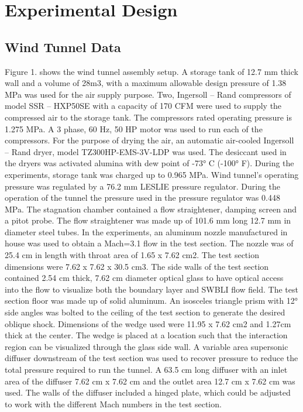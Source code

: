 \documentclass{article}
\begin{document}
\section{Experimental Design}
\subsection{Wind Tunnel Data}
Figure 1. shows the wind tunnel assembly setup. A storage tank of 12.7 mm thick wall and a volume of 28m3, with a maximum allowable design pressure of 1.38 MPa was used for the air supply purpose. Two, Ingersoll – Rand compressors of model SSR – HXP50SE with a capacity of 170 CFM were used to supply the compressed air to the storage tank. The compressors rated operating pressure is 1.275 MPa. A 3 phase, 60 Hz, 50 HP motor was used to run each of the compressors. For the purpose of drying the air, an automatic air-cooled Ingersoll – Rand dryer, model TZ300HP-EMS-3V-LDP was used.  The desiccant used in the dryers was activated alumina with dew point of -73° C (-100° F). During the experiments, storage tank was charged up to 0.965 MPa.
	Wind tunnel’s operating pressure was regulated by a 76.2 mm LESLIE pressure regulator. During the operation of the tunnel the pressure used in the pressure regulator was 0.448 MPa. The stagnation chamber contained a flow straightener, damping screen and a pitot probe. The flow straightener was made up of 101.6 mm long 12.7 mm in diameter steel tubes. In the experiments, an aluminum nozzle manufactured in house was used to obtain a Mach=3.1 flow in the test section. The nozzle was of 25.4 cm in length with throat area of 1.65 x 7.62 cm2.  
	The test section dimensions were 7.62 x 7.62 x 30.5 cm3. The side walls of the test section contained 2.54 cm thick, 7.62 cm diameter optical glass to have optical access into the flow to visualize both the boundary layer and SWBLI flow field. The test section floor was made up of solid aluminum. An isosceles triangle prism with 12° side angles was bolted to the ceiling of the test section to generate the desired oblique shock. Dimensions of the wedge used were 11.95 x 7.62 cm2 and 1.27cm thick at the center.  The wedge is placed at a location such that the interaction region can be visualized through the glass side wall. 
	A variable area supersonic diffuser downstream of the test section was used to recover pressure to reduce the total pressure required to run the tunnel. A 63.5 cm long diffuser with an inlet area of the diffuser 7.62 cm x 7.62 cm and the outlet area 12.7 cm x 7.62 cm was used. The walls of the diffuser included a hinged plate, which could be adjusted to work with the different Mach numbers in the test section. 
\end{document}
